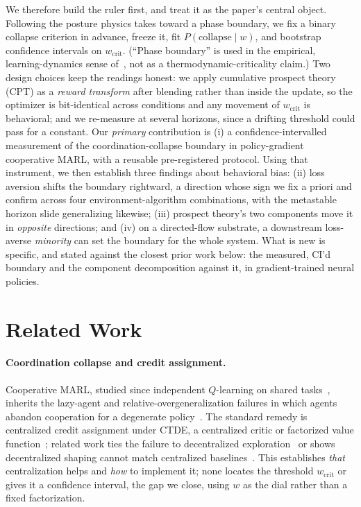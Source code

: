\documentclass[letterpaper]{article} %
\theoremstyle{plain}
\newcommand{\wcrit}{w_{\mathrm{crit}}}
\begin{document}
We therefore build the ruler first, and treat it as the paper's central object. Following the
posture physics takes toward a phase boundary, we fix a binary collapse criterion in advance,
freeze it, fit $P(\mathrm{collapse}\mid w)$, and bootstrap confidence intervals on $\wcrit$.
(``Phase boundary'' is used in the empirical, learning-dynamics sense
of~\citet{yamaguchi2025,capannoli2026phase}, not as a thermodynamic-criticality claim.) Two design
choices keep the readings honest: we apply cumulative prospect theory (CPT) as a \emph{reward
transform} after blending rather than inside the update, so the optimizer is bit-identical across
conditions and any movement of $\wcrit$ is behavioral; and we re-measure at several horizons, since
a drifting threshold could pass for a constant. Our \emph{primary} contribution is
(i) a confidence-intervalled measurement of the coordination-collapse boundary in policy-gradient
cooperative MARL, with a reusable pre-registered protocol. Using that instrument, we then establish
three findings about behavioral bias: (ii) loss aversion shifts the boundary rightward, a direction
whose sign we fix a priori and confirm across four environment-algorithm combinations, with the
metastable horizon slide generalizing likewise; (iii) prospect theory's two components move it in
\emph{opposite} directions; and (iv) on a directed-flow substrate, a downstream loss-averse
\emph{minority} can set the boundary for the whole system. What is new is specific, and stated
against the closest prior work below: the measured, CI'd boundary and the component decomposition
against it, in gradient-trained neural policies.

\section{Related Work}
\label{sec:related}

\paragraph{Coordination collapse and credit assignment.}
Cooperative MARL, studied since independent $Q$-learning on shared
tasks~\citep{tan1993multi,busoniu2008comprehensive}, inherits the lazy-agent and
relative-overgeneralization failures in which agents abandon cooperation for a degenerate
policy~\citep{liu2023lazy,peng2023curo,tampuu2017multiagent}. The standard remedy is centralized
credit assignment under CTDE, a centralized critic or factorized value
function~\citep{lowe2017multi,yu2022surprising,sunehag2018vdn,rashid2018qmix,foerster2018counterfactual,son2019qtran};
related work ties the failure to
decentralized exploration~\citep{weng2026} or shows decentralized shaping cannot match centralized
baselines~\citep{dmarl2025}. This establishes \emph{that} centralization helps and \emph{how} to
implement it; none locates the threshold $\wcrit$ or gives it a confidence interval, the gap we
close, using $w$ as the dial rather than a fixed factorization.
\end{document}
